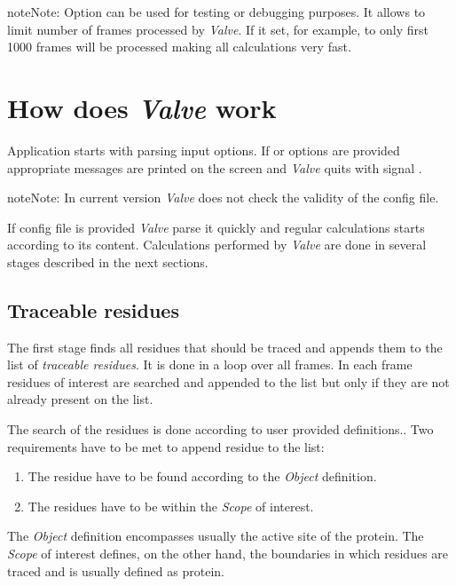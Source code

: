 \documentclass[a4paper,10pt,english]{sphinxmanual}
\begin{document}
\begin{notice}{note}{Note:}
Option  can be used for testing or debugging purposes. It allows to limit number of frames processed by \emph{Valve}.
If it set, for example, to  only first 1000 frames will be processed making all calculations very fast.
\end{notice}


\section{How does \emph{Valve} work}
\label{valve/valve_manual:how-does-valve-work}
Application starts with parsing input options. If  or  options are provided appropriate messages are printed on the screen and \emph{Valve} quits with signal .

\begin{notice}{note}{Note:}
In current version \emph{Valve} does not check the validity of the config file.
\end{notice}

If config file is provided \emph{Valve} parse it quickly and regular calculations starts according to its content. Calculations performed by \emph{Valve} are done in several stages described in the next sections.


\subsection{Traceable residues}
\label{valve/valve_manual:traceable-residues}
The first stage finds all residues that should be traced and appends them to the list of \emph{traceable residues}. It is done in a loop over all frames. In each frame residues of interest are searched and appended to the list but only if they are not already present on the list.

The search of the residues is done according to user provided definitions.. Two requirements have to be met to append residue to the list:
\begin{enumerate}
\item {} 
The residue have to be found according to the \emph{Object} definition.

\item {} 
The residues have to be within the \emph{Scope} of interest.

\end{enumerate}

The \emph{Object} definition encompasses usually the active site of the protein. The \emph{Scope} of interest defines, on the other hand, the boundaries in which residues are traced and is usually defined as protein.
\end{document}

